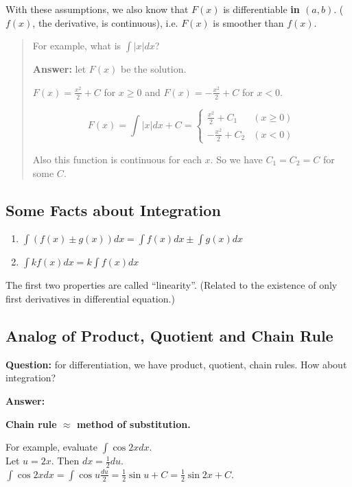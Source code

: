 With these assumptions, we also know that $F(x)$ is differentiable \textbf{in $(a, b)$}. ($f(x)$, the derivative, is continuous), i.e. $F(x)$ is smoother than $f(x)$.

\begin{quote}
For example, what is $\int |x| dx$?

\textbf{Answer:} let $F(x)$ be the solution.

$ F(x) = \frac{x^2}{2} + C $ for $x \geq 0$ and
$ F(x) = -\frac{x^2}{2} + C $ for $x < 0$.

$$
    F(x) = \int |x| dx + C = 
        \begin{cases}
            \frac{x^2}{2} + C_1 & (x \geq 0)\\
            -\frac{x^2}{2} + C_2 & (x < 0)
        \end{cases}
$$

Also this function is continuous for each $x$. So we have $C_1 = C_2 = C$ for some $C$.
\end{quote}

\subsection{Some Facts about Integration}

\begin{enumerate}
    \item $\int (f(x) \pm g(x)) dx = \int f(x) dx \pm \int g(x) dx$
    \item $\int kf(x) dx = k \int f(x) dx$
\end{enumerate}

The first two properties are called ``linearity''. (Related to the existence of only first derivatives in differential equation.)

\subsection{Analog of Product, Quotient and Chain Rule}

\textbf{Question:} for differentiation, we have product, quotient, chain rules. How about integration?

\textbf{Answer:}

\textbf{Chain rule $\approx$ method of substitution.}

For example, evaluate $ \int \cos 2x dx $.\\
Let $u = 2x$. Then $dx = \frac{1}{2}du$.\\
$ \int \cos 2x dx = \int \cos u \frac{du}{2} = \frac{1}{2} \sin u + C = \frac{1}{2} \sin 2x + C$.

